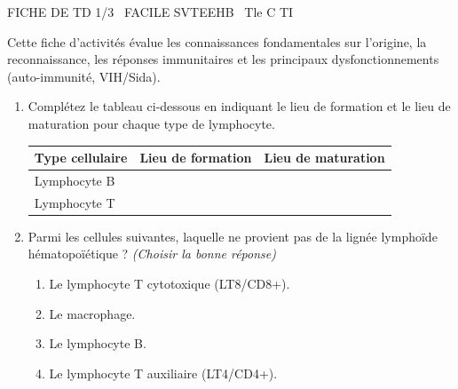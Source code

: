 \documentclass[11pt]{article}
\begin{document}
\begin{tcolorbox}[enhanced,colback=popink,colframe=popink,arc=10pt,boxrule=0pt,left=12pt,right=12pt,top=9pt,bottom=9pt]
{\color{white}\popxbold\small FICHE DE TD 1/3 \textbullet\ FACILE \hfill SVTEEHB \textbullet\ Tle C TI\par}
\end{tcolorbox}
\vspace{4pt}
Cette fiche d'activités évalue les connaissances fondamentales sur l'origine, la reconnaissance, les réponses immunitaires et les principaux dysfonctionnements (auto-immunité, VIH/Sida).

\begin{exercice}
\begin{enumerate}
    \item Complétez le tableau ci-dessous en indiquant le lieu de formation et le lieu de maturation pour chaque type de lymphocyte.
    \begin{tabularx}{\linewidth}{|X|c|c|}
    \hline
    \textbf{Type cellulaire} & \textbf{Lieu de formation} & \textbf{Lieu de maturation} \\
    \hline
    Lymphocyte B & & \\
    \hline
    Lymphocyte T & & \\
    \hline
    \end{tabularx}
    \item Parmi les cellules suivantes, laquelle ne provient pas de la lignée lymphoïde hématopoïétique ? \textit{(Choisir la bonne réponse)}
    \begin{enumerate}
        \item Le lymphocyte T cytotoxique (LT8/CD8+).
        \item Le macrophage.
        \item Le lymphocyte B.
        \item Le lymphocyte T auxiliaire (LT4/CD4+).
    \end{enumerate}
\end{enumerate}
\end{exercice}
\end{document}
